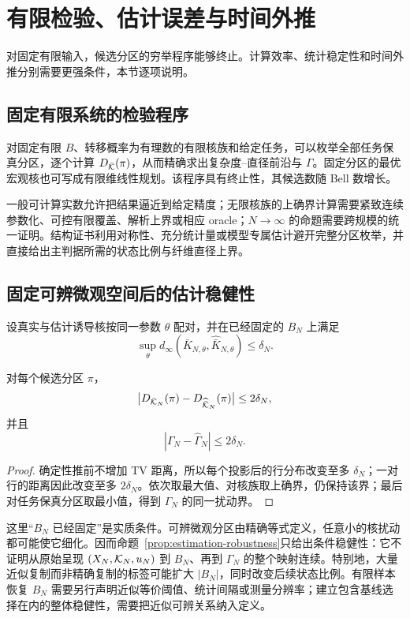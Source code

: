 \section{有限检验、估计误差与时间外推}
\label{sec:verification}

对固定有限输入，候选分区的穷举程序能够终止。计算效率、统计稳定性和时间外推分别需要更强条件，本节逐项说明。

\subsection{固定有限系统的检验程序}

对固定有限 $B$、转移概率为有理数的有限核族和给定任务，可以枚举全部任务保真分区，逐个计算 $D_{\bar{\mathcal K}}(\pi)$，从而精确求出复杂度--直径前沿与 $\Gamma$。固定分区的最优宏观核也可写成有限维线性规划。该程序具有终止性，其候选数随 Bell 数增长。

一般可计算实数允许把结果逼近到给定精度；无限核族的上确界计算需要紧致连续参数化、可控有限覆盖、解析上界或相应 oracle；$N\to\infty$ 的命题需要跨规模的统一证明。结构证书利用对称性、充分统计量或模型专属估计避开完整分区枚举，并直接给出主判据所需的状态比例与纤维直径上界。

\subsection{固定可辨微观空间后的估计稳健性}

设真实与估计诱导核按同一参数 $\theta$ 配对，并在已经固定的 $B_N$ 上满足
\[
\sup_\theta d_\infty(\bar K_{N,\theta},\widehat{\bar K}_{N,\theta})
\le\delta_N.
\]

\begin{proposition}[证书扰动界]
\label{prop:estimation-robustness}
对每个候选分区 $\pi$，
\[
\bigl|D_{\bar{\mathcal K}_N}(\pi)-D_{\widehat{\bar{\mathcal K}}_N}(\pi)\bigr|
\le2\delta_N,
\]
并且
\[
|\Gamma_N-\widehat\Gamma_N|\le2\delta_N.
\]
\end{proposition}

\begin{proof}
确定性推前不增加 TV 距离，所以每个投影后的行分布改变至多 $\delta_N$；一对行的距离因此改变至多 $2\delta_N$。依次取最大值、对核族取上确界，仍保持该界；最后对任务保真分区取最小值，得到 $\Gamma_N$ 的同一扰动界。
\end{proof}

这里“$B_N$ 已经固定”是实质条件。可辨微观分区由精确等式定义，任意小的核扰动都可能使它细化。因而命题~\ref{prop:estimation-robustness}只给出条件稳健性：它不证明从原始呈现 $(X_N,\mathcal K_N,u_N)$ 到 $B_N$、再到 $\Gamma_N$ 的整个映射连续。特别地，大量近似复制而非精确复制的标签可能扩大 $|B_N|$，同时改变后续状态比例。有限样本恢复 $B_N$ 需要另行声明近似等价阈值、统计间隔或测量分辨率；建立包含基线选择在内的整体稳健性，需要把近似可辨关系纳入定义。

